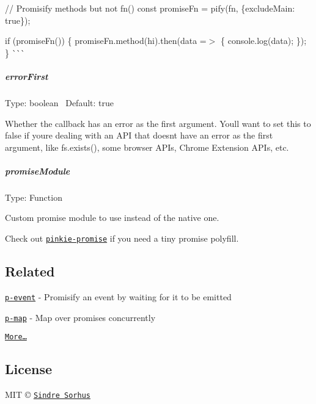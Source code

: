 // Promisify methods but not {\ttfamily fn()} const promise\+Fn = pify(fn, \{exclude\+Main\+: true\});

if (promise\+Fn()) \{ promise\+Fn.\+method(\textquotesingle{}hi\textquotesingle{}).then(data =$>$ \{ console.\+log(data); \}); \} \`{}\`{}\`{}

\subparagraph*{error\+First}

Type\+: {\ttfamily boolean}~\newline
 Default\+: {\ttfamily true}

Whether the callback has an error as the first argument. You\textquotesingle{}ll want to set this to {\ttfamily false} if you\textquotesingle{}re dealing with an A\+PI that doesn\textquotesingle{}t have an error as the first argument, like {\ttfamily fs.\+exists()}, some browser A\+P\+Is, Chrome Extension A\+P\+Is, etc.

\subparagraph*{promise\+Module}

Type\+: {\ttfamily Function}

Custom promise module to use instead of the native one.

Check out \href{https://github.com/floatdrop/pinkie-promise}{\tt {\ttfamily pinkie-\/promise}} if you need a tiny promise polyfill.

\subsection*{Related}


\begin{DoxyItemize}
\item \href{https://github.com/sindresorhus/p-event}{\tt p-\/event} -\/ Promisify an event by waiting for it to be emitted
\item \href{https://github.com/sindresorhus/p-map}{\tt p-\/map} -\/ Map over promises concurrently
\item \href{https://github.com/sindresorhus/promise-fun}{\tt More…}
\end{DoxyItemize}

\subsection*{License}

M\+IT © \href{https://sindresorhus.com}{\tt Sindre Sorhus} 